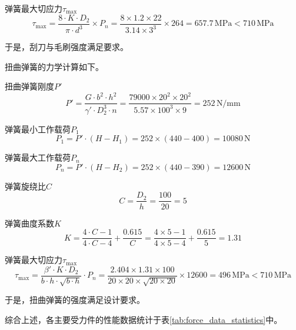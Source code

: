 弹簧最大切应力$\tau_{\max}$
\begin{equation}
    \tau_{\max} = \frac{8 \cdot K \cdot D_2}{\pi \cdot d^3} \times P_n = \frac{8 \times 1.2 \times 22}{3.14 \times 3^3} \times 264 = 657.7 \, \text{MPa} < 710 \, \text{MPa}
\end{equation}

于是，刮刀与毛刷强度满足要求。

扭曲弹簧的力学计算如下。

扭曲弹簧刚度$P'$
\begin{equation}
    P' = \frac{G \cdot b^2 \cdot h^2}{\gamma' \cdot D_2^3 \cdot n} = \frac{79000 \times 20^2 \times 20^2}{5.57 \times 100^3 \times 9} = 252 \, \text{N/mm}
\end{equation}

弹簧最小工作载荷$P_1$
\begin{equation}
    P_1 = P' \cdot (H - H_1) = 252 \times (440 - 400) = 10080 \, \text{N}
\end{equation}

弹簧最大工作载荷$P_n$
\begin{equation}
    P_n = P' \cdot (H - H_2) = 252 \times (440 - 390) = 12600 \, \text{N}
\end{equation}

弹簧旋绕比$C$
\begin{equation}
    C = \frac{D_2}{h} = \frac{100}{20} = 5
\end{equation}

弹簧曲度系数$K$
\begin{equation}
    K = \frac{4 \cdot C - 1}{4 \cdot C - 4} + \frac{0.615}{C} = \frac{4 \times 5 - 1}{4 \times 5 - 4} + \frac{0.615}{5} = 1.31
\end{equation}

弹簧最大切应力$\tau_{\max}$
\begin{equation}
    \tau_{\max} = \frac{\beta' \cdot K \cdot D_2}{b \cdot h \cdot \sqrt{b \cdot h}} \cdot P_n = \frac{2.404 \times 1.31 \times 100}{20 \times 20 \times \sqrt{20 \times 20}} \times 12600 = 496 \, \text{MPa} < 710 \, \text{MPa}
\end{equation}

于是，扭曲弹簧的强度满足设计要求。



综合上述，各主要受力件的性能数据统计于表\ref{tab:force_data_statistics}中。


